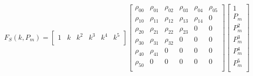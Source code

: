 \documentclass[11pt,a4paper]{article}
\begin{document}
\begin{equation}
F_{S}(k,P_m) = 
\begin{bmatrix}
        1 & k & k^2 & k^3 & k^4 & k^5\\
    \end{bmatrix}
    \begin{bmatrix}
        \rho_{00} & \rho_{01} & \rho_{02} & \rho_{03} & \rho_{04} & \rho_{05}\\
        \rho_{10} & \rho_{11} & \rho_{12} & \rho_{13} & \rho_{14} & 0\\
        \rho_{20} & \rho_{21} & \rho_{22} & \rho_{23} & 0         & 0\\
        \rho_{30} & \rho_{31} & \rho_{32} & 0         & 0         & 0\\
        \rho_{40} & \rho_{41} & 0         & 0         & 0         & 0\\
        \rho_{50} & 0         & 0         & 0         & 0         & 0\\
    \end{bmatrix}
    \begin{bmatrix}
        1\\
        P_m\\
        P_m^2\\
        P_m^3\\
        P_m^4\\
        P_m^5\\
    \end{bmatrix}
    \label{math:fce_matrix}
\end{equation}
\end{document}
